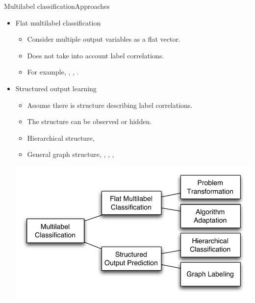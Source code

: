 \documentclass[first=dgreen,second=purple,logo=yellowexc]{aaltoslides}
\begin{document}
{\begin{frame}{Multilabel classification}{Approaches}
	\begin{itemize}
		\item Flat multilabel classification
		\begin{itemize}
			\footnotesize
			\item Consider multiple output variables as a flat vector.
			\item Does not take into account label correlations.
			\item For example, \mlknn, \adaboost, \mtl.
		\end{itemize}
		\item Structured output learning
		\begin{itemize}
			\footnotesize
			\item Assume there is structure describing label correlations.
			\item The structure can be observed or hidden.
			\item Hierarchical structure, \svmstruct
			\item General graph structure, \mmmn, \crf, \mmcrf, \rta
		\end{itemize}
		\begin{center}
			\includegraphics[scale=0.3]{./figures/taxonomy.pdf}
		\end{center}
	\end{itemize}
\end{frame}

}
\end{document}
